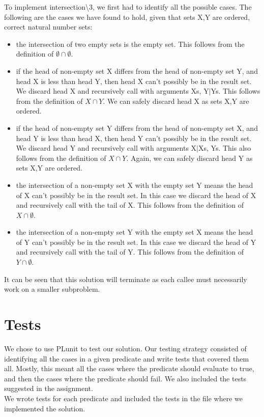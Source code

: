 \documentclass[]{article}
\begin{document}
To implement intersection\textbackslash3, we first had to identify all the possible cases. The following are the cases we have found to hold, given that sets X,Y are ordered, correct natural number sets:

\begin{itemize}
	\item the intersection of two empty sets is the empty set. This follows from the definition of $\emptyset \cap \emptyset$.
	\item if the head of non-empty set X differs from the head of non-empty set Y, and head X is less than head Y, then head X can't possibly be in the result set. We discard head X and recursively call with arguments Xs, Y$|$Ys. This follows from the definition of $X \cap Y$. We can safely discard head X as sets X,Y are ordered.
	\item if the head of non-empty set Y differs from the head of non-empty set X, and head Y is less than head X, then head Y can't possibly be in the result set. We discard head Y and recursively call with arguments X$|$Xs, Ys. This also follows from the definition of $X \cap Y$. Again, we can safely discard head Y as sets X,Y are ordered.
	\item the intersection of a non-empty set X with the empty set Y means the head of X can't possibly be in the result set. In this case we discard the head of X and recursively call with the tail of X. This follows from the definition of $X \cap \emptyset$.
	\item the intersection of a non-empty set Y with the empty set X means the head of Y can't possibly be in the result set. In this case we discard the head of Y and recursively call with the tail of Y. This follows from the definition of $Y \cap \emptyset$.

\end{itemize}

It can be seen that this solution will terminate as each callee must necessarily work on a smaller subproblem.\par

\section{Tests} %
\label{sec:tests}
We chose to use PLunit to test our solution. Our testing strategy consisted of identifying all the cases in a given predicate and write tests that covered them all. Mostly, this meant all the cases where the predicate should evaluate to true, and then the cases where the predicate should fail. We also included the tests suggested in the assignment. \\
We wrote tests for each predicate and included the tests in the file where we implemented the solution. \\
\end{document}
